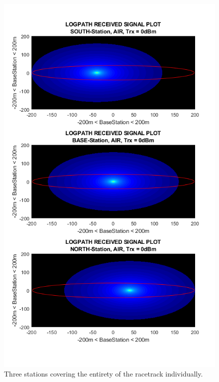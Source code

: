 \begin{figure}[H]
	\centering
	\includegraphics[width=\linewidth]{theory/pathLoss/fig/logpathReceivedSignal_eachStation_air_highSignal.png}
	\caption{Three stations covering the entirety of the racetrack individually.}
	\label{fig:logpathReceivedSignal_eachStation_air_highSignal}
\end{figure}


